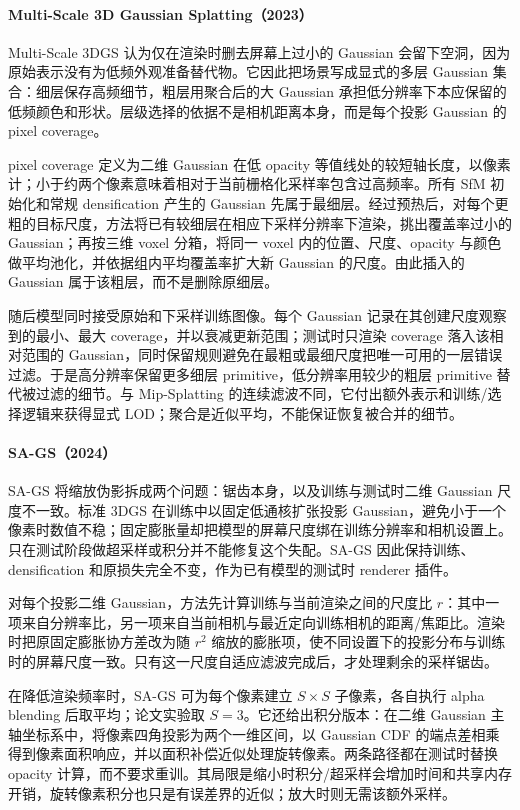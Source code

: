 \paragraph{Multi-Scale 3D Gaussian Splatting（2023）\cite{2311_17089}}
Multi-Scale 3DGS 认为仅在渲染时删去屏幕上过小的 Gaussian 会留下空洞，因为原始表示没有为低频外观准备替代物。它因此把场景写成显式的多层 Gaussian 集合：细层保存高频细节，粗层用聚合后的大 Gaussian 承担低分辨率下本应保留的低频颜色和形状。层级选择的依据不是相机距离本身，而是每个投影 Gaussian 的 pixel coverage。

pixel coverage 定义为二维 Gaussian 在低 opacity 等值线处的较短轴长度，以像素计；小于约两个像素意味着相对于当前栅格化采样率包含过高频率。所有 SfM 初始化和常规 densification 产生的 Gaussian 先属于最细层。经过预热后，对每个更粗的目标尺度，方法将已有较细层在相应下采样分辨率下渲染，挑出覆盖率过小的 Gaussian；再按三维 voxel 分箱，将同一 voxel 内的位置、尺度、opacity 与颜色做平均池化，并依据组内平均覆盖率扩大新 Gaussian 的尺度。由此插入的 Gaussian 属于该粗层，而不是删除原细层。

随后模型同时接受原始和下采样训练图像。每个 Gaussian 记录在其创建尺度观察到的最小、最大 coverage，并以衰减更新范围；测试时只渲染 coverage 落入该相对范围的 Gaussian，同时保留规则避免在最粗或最细尺度把唯一可用的一层错误过滤。于是高分辨率保留更多细层 primitive，低分辨率用较少的粗层 primitive 替代被过滤的细节。与 Mip-Splatting 的连续滤波不同，它付出额外表示和训练/选择逻辑来获得显式 LOD；聚合是近似平均，不能保证恢复被合并的细节。

\paragraph{SA-GS（2024）\cite{2403_19615}}
SA-GS 将缩放伪影拆成两个问题：锯齿本身，以及训练与测试时二维 Gaussian 尺度不一致。标准 3DGS 在训练中以固定低通核扩张投影 Gaussian，避免小于一个像素时数值不稳；固定膨胀量却把模型的屏幕尺度绑在训练分辨率和相机设置上。只在测试阶段做超采样或积分并不能修复这个失配。SA-GS 因此保持训练、densification 和原损失完全不变，作为已有模型的测试时 renderer 插件。

对每个投影二维 Gaussian，方法先计算训练与当前渲染之间的尺度比 $r$：其中一项来自分辨率比，另一项来自当前相机与最近定向训练相机的距离/焦距比。渲染时把原固定膨胀协方差改为随 $r^2$ 缩放的膨胀项，使不同设置下的投影分布与训练时的屏幕尺度一致。只有这一尺度自适应滤波完成后，才处理剩余的采样锯齿。

在降低渲染频率时，SA-GS 可为每个像素建立 $S\times S$ 子像素，各自执行 alpha blending 后取平均；论文实验取 $S=3$。它还给出积分版本：在二维 Gaussian 主轴坐标系中，将像素四角投影为两个一维区间，以 Gaussian CDF 的端点差相乘得到像素面积响应，并以面积补偿近似处理旋转像素。两条路径都在测试时替换 opacity 计算，而不要求重训。其局限是缩小时积分/超采样会增加时间和共享内存开销，旋转像素积分也只是有误差界的近似；放大时则无需该额外采样。


